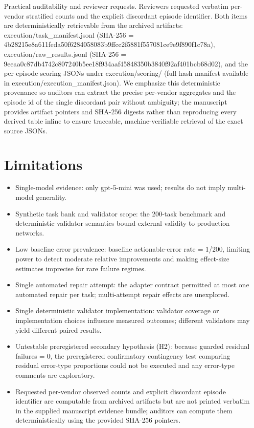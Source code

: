 \documentclass[conference]{IEEEtran}
\begin{document}
Practical auditability and reviewer requests. Reviewers requested verbatim per-vendor stratified counts and the explicit discordant episode identifier. Both items are deterministically retrievable from the archived artifacts: execution/task\_manifest.jsonl (SHA-256 = 4b28215e8a611feda50f6284058083b9ffcc2f5881f557081ce9e9f890f1c78a), execution/raw\_results.jsonl (SHA-256 = 9eeaa0c87db4742c807240b5ee18f934aaf45848350b3840f92af401bcb68d02), and the per-episode scoring JSONs under execution/scoring/ (full hash manifest available in execution/execution\_manifest.json). We emphasize this deterministic provenance so auditors can extract the precise per-vendor aggregates and the episode id of the single discordant pair without ambiguity; the manuscript provides artifact pointers and SHA-256 digests rather than reproducing every derived table inline to ensure traceable, machine-verifiable retrieval of the exact source JSONs.

\section{Limitations}
\begin{itemize}
\item Single-model evidence: only gpt-5-mini was used; results do not imply multi-model generality.
\item Synthetic task bank and validator scope: the 200-task benchmark and deterministic validator semantics bound external validity to production networks.
\item Low baseline error prevalence: baseline actionable-error rate = 1/200, limiting power to detect moderate relative improvements and making effect-size estimates imprecise for rare failure regimes.
\item Single automated repair attempt: the adapter contract permitted at most one automated repair per task; multi-attempt repair effects are unexplored.
\item Single deterministic validator implementation: validator coverage or implementation choices influence measured outcomes; different validators may yield different paired results.
\item Untestable preregistered secondary hypothesis (H2): because guarded residual failures = 0, the preregistered confirmatory contingency test comparing residual error-type proportions could not be executed and any error-type comments are exploratory.
\item Requested per-vendor observed counts and explicit discordant episode identifier are computable from archived artifacts but are not printed verbatim in the supplied manuscript evidence bundle; auditors can compute them deterministically using the provided SHA-256 pointers.
\end{itemize}
\end{document}
